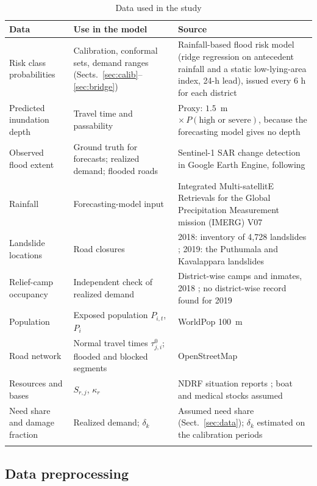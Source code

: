 \documentclass[pdflatex,sn-basic]{sn-jnl}
\theoremstyle{plain}%
\theoremstyle{remark}%
\theoremstyle{definition}%
\begin{document}
\begin{table}[h]
\caption{Data used in the study}\label{tab:data}
\footnotesize
\begin{tabular*}{\textwidth}{@{\extracolsep\fill}p{3.4cm}p{3.6cm}p{4.4cm}}
\toprule
Data & Use in the model & Source \\
\midrule
Risk class probabilities & Calibration, conformal sets, demand ranges (Sects.~\ref{sec:calib}--\ref{sec:bridge}) & Rainfall-based flood risk model (ridge regression on antecedent rainfall and a static low-lying-area index, 24-h lead), issued every 6 h for each district \\
Predicted inundation depth & Travel time and passability & Proxy: $1.5$~m $\times\,P(\text{high or severe})$, because the forecasting model gives no depth \\
Observed flood extent & Ground truth for forecasts; realized demand; flooded roads & Sentinel-1 SAR change detection in Google Earth Engine, following \citet{Tiwari2020} \\
Rainfall & Forecasting-model input & Integrated Multi-satellitE Retrievals for the Global Precipitation Measurement mission (IMERG) V07 \citep{IMERG} \\
Landslide locations & Road closures & 2018: inventory of 4,728 landslides \citep{Hao2020}; 2019: the Puthumala and Kavalappara landslides \citep{NDRF2019} \\
Relief-camp occupancy & Independent check of realized demand & District-wise camps and inmates, 2018 \citep{GoK2018Memo}; no district-wise record found for 2019 \\
Population & Exposed population $P_{i,t}$, $P_i$ & WorldPop 100~m \citep{WorldPop} \\
Road network & Normal travel times $\tau^0_{j,i}$; flooded and blocked segments & OpenStreetMap \citep{OSM} \\
Resources and bases & $S_{r,j}$, $\kappa_r$ & NDRF situation reports \citep{NDRF2018,NDRF2018b,NDRF2019}; boat and medical stocks assumed \\
Need share and damage fraction & Realized demand; $\delta_k$ & Assumed need share (Sect.~\ref{sec:data}); $\delta_k$ estimated on the calibration periods \\
\botrule
\end{tabular*}
\end{table}

\subsection{Data preprocessing}
\end{document}
